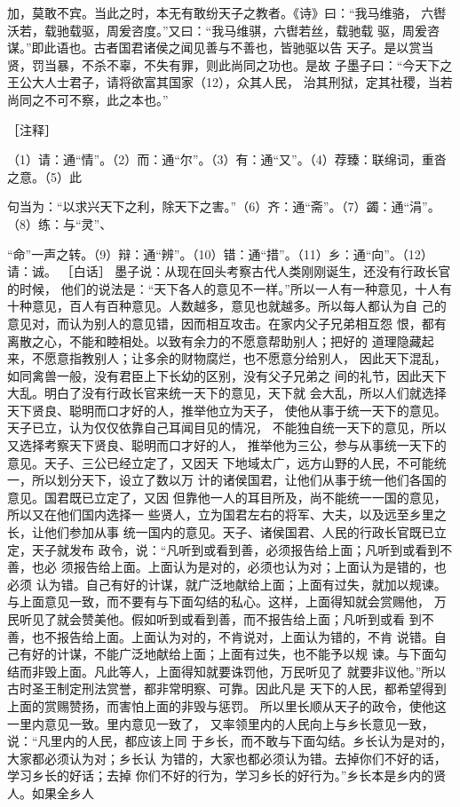 \documentclass[12pt,UTF8]{ctexbook}
\begin{document}
加，莫敢不宾。当此之时，本无有敢纷天子之教者。《诗》曰：“我马维骆， 
六辔沃若，载驰载驱，周爰咨度。”又曰：“我马维骐，六辔若丝，载驰载 
驱，周爰咨谋。”即此语也。古者国君诸侯之闻见善与不善也，皆驰驱以告 
天子。是以赏当贤，罚当暴，不杀不辜，不失有罪，则此尚同之功也。是故 
子墨子曰：“今天下之王公大人士君子，请将欲富其国家（12），众其人民， 
治其刑狱，定其社稷，当若尚同之不可不察，此之本也。” 


［注释］ 

（1）请：通“情”。（2）而：通“尔”。（3）有：通“又”。（4）荐臻：联绵词，重沓之意。（5）此 

句当为：“以求兴天下之利，除天下之害。”（6）齐：通“斋”。（7）蠲：通“涓”。（8）练：与“灵”、 

“命”一声之转。（9）辩：通“辨”。（10）错：通“措”。（11）乡：通“向”。（12）请：诚。 
［白话］ 
墨子说：从现在回头考察古代人类刚刚诞生，还没有行政长官的时候， 
他们的说法是：“天下各人的意见不一样。”所以一人有一种意见，十人有 
十种意见，百人有百种意见。人数越多，意见也就越多。所以每人都认为自 
己的意见对，而认为别人的意见错，因而相互攻击。在家内父子兄弟相互怨 
恨，都有离散之心，不能和睦相处。以致有余力的不愿意帮助别人；把好的 
道理隐藏起来，不愿意指教别人；让多余的财物腐烂，也不愿意分给别人， 
因此天下混乱，如同禽兽一般，没有君臣上下长幼的区别，没有父子兄弟之 
间的礼节，因此天下大乱。明白了没有行政长官来统一天下的意见，天下就 
会大乱，所以人们就选择天下贤良、聪明而口才好的人，推举他立为天子， 
使他从事于统一天下的意见。天子已立，认为仅仅依靠自己耳闻目见的情况， 
不能独自统一天下的意见，所以又选择考察天下贤良、聪明而口才好的人， 
推举他为三公，参与从事统一天下的意见。天子、三公已经立定了，又因天 
下地域太广，远方山野的人民，不可能统一，所以划分天下，设立了数以万 
计的诸侯国君，让他们从事于统一他们各国的意见。国君既已立定了，又因 
但靠他一人的耳目所及，尚不能统一一国的意见，所以又在他们国内选择一 
些贤人，立为国君左右的将军、大夫，以及远至乡里之长，让他们参加从事 
统一国内的意见。天子、诸侯国君、人民的行政长官既已立定，天子就发布 
政令，说：“凡听到或看到善，必须报告给上面；凡听到或看到不善，也必 
须报告给上面。上面认为是对的，必须也认为对；上面认为是错的，也必须 
认为错。自己有好的计谋，就广泛地献给上面；上面有过失，就加以规谏。 
与上面意见一致，而不要有与下面勾结的私心。这样，上面得知就会赏赐他， 
万民听见了就会赞美他。假如听到或看到善，而不报告给上面；凡听到或看 
到不善，也不报告给上面。上面认为对的，不肯说对，上面认为错的，不肯 
说错。自己有好的计谋，不能广泛地献给上面；上面有过失，也不能予以规 
谏。与下面勾结而非毁上面。凡此等人，上面得知就要诛罚他，万民听见了 
就要非议他。”所以古时圣王制定刑法赏誉，都非常明察、可靠。因此凡是 
天下的人民，都希望得到上面的赏赐赞扬，而害怕上面的非毁与惩罚。 
所以里长顺从天子的政令，使他这一里内意见一致。里内意见一致了， 
又率领里内的人民向上与乡长意见一致，说：“凡里内的人民，都应该上同 
于乡长，而不敢与下面勾结。乡长认为是对的，大家都必须认为对；乡长认 
为错的，大家也都必须认为错。去掉你们不好的话，学习乡长的好话；去掉 
你们不好的行为，学习乡长的好行为。”乡长本是乡内的贤人。如果全乡人 
\end{document}
